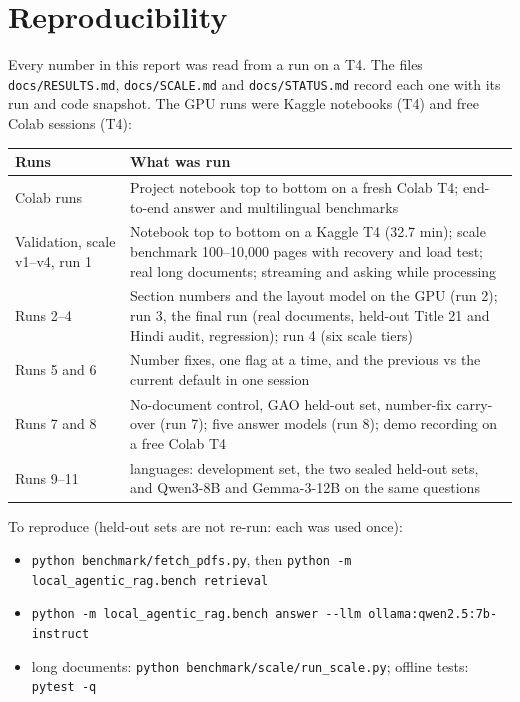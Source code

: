 \documentclass[10pt,a4paper]{article}
\begin{document}
\section{Reproducibility}
Every number in this report was read from a run on a T4. The files \texttt{docs/RESULTS.md}, \texttt{docs/SCALE.md} and \texttt{docs/STATUS.md} record each one with its run and code snapshot.
The GPU runs were Kaggle notebooks (T4) and free Colab sessions (T4):\par
\renewcommand{\arraystretch}{1.15}
{\fontsize{8.3}{10}\selectfont
\begin{tabularx}{\textwidth}{@{}p{22mm} >{\raggedright\arraybackslash}X@{}}
\toprule
\textbf{Runs} & \textbf{What was run} \\ \midrule
Colab runs & Project notebook top to bottom on a fresh Colab T4; end-to-end answer and multilingual benchmarks \\
Validation, scale v1--v4, run 1 & Notebook top to bottom on a Kaggle T4 (32.7 min); scale benchmark 100--10,000 pages with recovery and load test; real long documents; streaming and asking while processing \\
Runs 2--4 & Section numbers and the layout model on the GPU (run 2); run 3, the final run (real documents, held-out Title 21 and Hindi audit, regression); run 4 (six scale tiers) \\
Runs 5 and 6 & Number fixes, one flag at a time, and the previous vs the current default in one session \\
Runs 7 and 8 & No-document control, GAO held-out set, number-fix carry-over (run 7); five answer models (run 8); demo recording on a free Colab T4 \\
Runs 9--11 & 22 languages: development set, the two sealed held-out sets, and Qwen3-8B and Gemma-3-12B on the same questions \\
\bottomrule
\end{tabularx}}

\vspace{3pt}
To reproduce (held-out sets are not re-run: each was used once):
\begin{itemize}
  \item \texttt{python benchmark/fetch\_pdfs.py}, then \texttt{python -m local\_agentic\_rag.bench retrieval}
  \item \texttt{python -m local\_agentic\_rag.bench answer -{}-llm ollama:qwen2.5:7b-instruct}
  \item long documents: \texttt{python benchmark/scale/run\_scale.py}; offline tests: \texttt{pytest -q}
\end{itemize}
\end{document}

